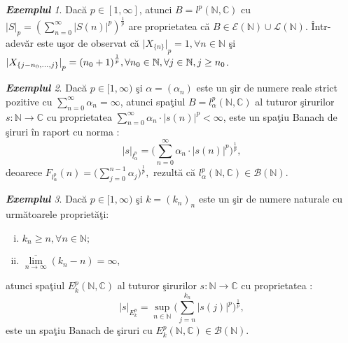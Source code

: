 \documentclass[ a4paper, 12pt]{report}
\theoremstyle{remark}
\newtheorem{exemple}{\bf Exemplul}[section]
\numberwithin{equation}{section}
\begin{document}
\begin{exemple}
Dac\u a $p \in [1,\infty]$, atunci $B=l^p(\mathbb{N},\mathbb{C})$ cu \\
${\lvert S \rvert}_p=(\sum\limits_{n=0}^{\infty}{{\lvert S(n) \rvert}^p})^\frac{1}{p}$ are proprietatea c\u a $B \in \mathcal{E}(\mathbb{N}) \cup \mathcal{L}(\mathbb{N})$. \^Intr-adev\u ar este u\c sor de observat c\u a ${\lvert X_{\{n\}} \rvert}_p=1,\forall n \in \mathbb{N}$ \c si ${\lvert X_{\{j-n_0,...,j\}} \rvert}_p={(n_0+1)}^\frac{1}{p},\\
 \forall n_0 \in \mathbb{N},\forall j \in \mathbb{N},j \geq n_0$.
\end{exemple}
\begin{exemple}
Dac\u a $p \in [1,\infty)$ \c si $\alpha = (\alpha_{n})$ este un \c sir de numere reale strict pozitive cu $\sum\limits_{n=0}^{\infty} \alpha_n = \infty$, atunci spa\c tiul $B = l_\alpha^p(\mathbb{N},\mathbb{C})$ al tuturor \c sirurilor $s : \mathbb{N} \rightarrow \mathbb{C}$ cu proprietatea  $\sum\limits_{n=0}^{\infty} \alpha_n \cdot \lvert s(n) \rvert^p < \infty$, este un spa\c tiu Banach de \c siruri \^in raport cu norma :
\[ \lvert s \rvert_{l_{\alpha}^{p}} = \Big(\sum\limits_{n=0}^{\infty} \alpha_n \cdot \lvert s(n) \rvert^p\Big)^{\frac{1}{p}},\]deoarece $F_{l_{\alpha}^{p}}(n) = \Big(\sum\limits_{j=0}^{n-1} \alpha_j\Big)^{\frac{1}{p}} ,$
rezult\u a c\u a $l_{\alpha}^{p}(\mathbb{N},\mathbb{C}) \in \mathcal{B}(\mathbb{N}).$
\end{exemple}
\begin{exemple}
Dac\u a $p\in [1,\infty)$ \c si $k = (k_n)_n$ este un \c sir de numere naturale cu urm\u atoarele propriet\u a\c ti:
\begin{enumerate}[(i)]
\item $k_n \geq n, \forall n \in \mathbb{N};$
\item $\overline{\lim\limits_{n \rightarrow \infty}}(k_n - n) = \infty,$
\end{enumerate} atunci spa\c tiul $E_{k}^{p}(\mathbb{N},\mathbb{C})$ al tuturor \c sirurilor $s : \mathbb{N} \rightarrow \mathbb{C}$ cu proprietatea :
\[ \lvert s \rvert_{E_{k}^{p}} = \sup\limits_{n \in \mathbb{N}}\Big(\sum\limits_{j=n}^{k_n}\lvert s(j) \rvert^{p}\Big)^{\frac{1}{p}},\] este un spa\c tiu Banach de \c siruri cu $E_{k}^{p}(\mathbb{N},\mathbb{C}) \in \mathcal{B}(\mathbb{N}).$
\end{exemple}
\end{document}
